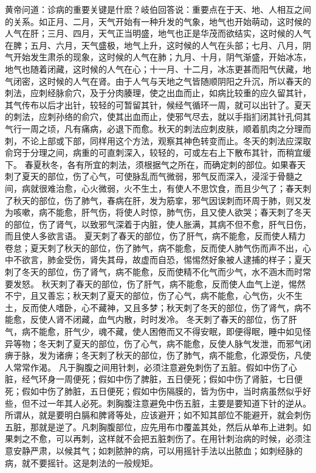 \documentclass[12pt,UTF8]{ctexbook}
\begin{document}
黄帝问道：诊病的重要关键是什麽？岐伯回答说：重要点在于天、地、人相互之间的关系。如正月、二月，天气开始有一种升发的气象，地气也开始萌动，这时候的人气在肝；三月、四月，天气正当明盛，地气也正是华茂而欲结实，这时候的人气在脾；五月、六月，天气盛极，地气上升，这时候的人气在头部；七月、八月，阴气开始发生肃杀的现象，这时候的人气在肺；九月、十月，阴气渐盛，开始冰冻，地气也随着闭藏，这时候的人气在心；十一月、十二月，冰冻更甚而阳气伏藏，地气闭密，这时候的人气在肾。由于人气与天地之气皆随顺阴阳之升沉，所以春天的刺法，应刺经脉俞穴，及于分肉腠理，使之出血而止，如病比较重的应久留其针，其气传布以后才出针，较轻的可暂留其针，候经气循环一周，就可以出针了。夏天的刺法，应刺孙络的俞穴，使其出血而止，使邪气尽去，就以手指扪闭其针孔伺其气行一周之顷，凡有痛病，必退下而愈。秋天的刺法应刺皮肤，顺着肌肉之分理而刺，不论上部或下部，同样用这个方法，观察其神色转变而止。冬天的刺法应深取俞窍于分理之间，病重的可直刺深入，较轻的，可或左右上下散布其针，而稍宜缓下。
春夏秋冬，各有所宜的刺法，须根据气之所在，而确定刺的部位。如果春天刺了夏天的部位，伤了心气，可使脉乱而气微弱，邪气反而深入，浸淫于骨髓之间，病就很难治愈，心火微弱，火不生土，有使人不思饮食，而且少气了；春天刺了秋天的部位，伤了肺气，春病在肝，发为筋挛，邪气因误刺而环周于肺，则又发为咳嗽，病不能愈，肝气伤，将使人时惊，肺气伤，且又使人欲哭；春天刺了冬天的部位，伤了肾气，以致邪气深着于内脏，使人胀满，其病不但不愈，肝气日伤，而且使人多欲言语。
夏天刺了春天的部位，伤了肝气，病不能愈，反而使人精力卷怠；夏天刺了秋天的部位，伤了肺气，病不能愈，反而使人肺气伤而声不出，心中不欲言，肺金受伤，肾失其母，故虚而自恐，惕惕然好象被人逮捕的样子；夏天刺了冬天的部位，伤了肾气，病不能愈，反而使精不化气而少气，水不涵木而时常要发怒。
秋天刺了春天的部位，伤了肝气，病不能愈，反而使人血气上逆，惕然不宁，且又善忘；秋天刺了夏天的部位，伤了心气，病不能愈，心气伤，火不生土，反而使人嗜卧，心不藏神，又且多梦；秋天刺了冬天的部位，伤了肾气，病不能愈，反使人肾不闭藏，血气内散，时时发冷。
冬天刺了春天的部位，伤了肝气，病不能愈，肝气少，魂不藏，使人困倦而又不得安眠，即便得眠，睡中如见怪异等物；冬天刺了夏天的部位，伤了心气，病不能愈，反使人脉气发泄，而邪气闭痹于脉，发为诸痹；冬天刺了秋天的部位，伤了肺气，病不能愈，化源受伤，凡使人常常作渴。
凡于胸腹之间用针刺，必须注意避免刺伤了五脏。假如中伤了心脏，经气环身一周便死；假如中伤了脾脏，五日便死；假如中伤了肾脏，七日便死；假如中伤了肺脏，五日便死；假如中伤隔膜的，皆为伤中，当时病虽然似乎好些，但不过一年其人必死。刺胸腹注意避免中伤五脏，主要是要知道下针的逆从。所谓从，就是要明白膈和脾肾等处，应该避开；如不知其部位不能避开，就会刺伤五脏，那就是逆了。凡刺胸腹部位，应先用布巾覆盖其处，然后从单布上进刺。如果刺之不愈，可以再刺，这样就不会把五脏刺伤了。在用针刺治病的时候，必须注意安静严肃，以候其气；如刺脓肿的病，可以用摇针手法以出脓血；如刺经脉的病，就不要摇针。这是刺法的一般规矩。
\end{document}
